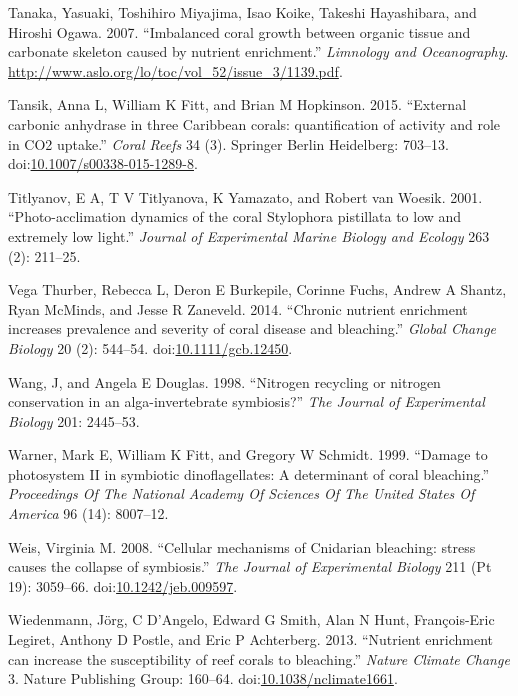 \documentclass[]{elsarticle} %
\begin{document}
\hypertarget{ref-Tanaka:2007uv}{}
Tanaka, Yasuaki, Toshihiro Miyajima, Isao Koike, Takeshi Hayashibara,
and Hiroshi Ogawa. 2007. ``Imbalanced coral growth between organic
tissue and carbonate skeleton caused by nutrient enrichment.''
\emph{Limnology and Oceanography}.
\url{http://www.aslo.org/lo/toc/vol_52/issue_3/1139.pdf}.

\hypertarget{ref-Tansik:2015cm}{}
Tansik, Anna L, William K Fitt, and Brian M Hopkinson. 2015. ``External
carbonic anhydrase in three Caribbean corals: quantification of activity
and role in CO2 uptake.'' \emph{Coral Reefs} 34 (3). Springer Berlin
Heidelberg: 703--13.
doi:\href{https://doi.org/10.1007/s00338-015-1289-8}{10.1007/s00338-015-1289-8}.

\hypertarget{ref-Titlyanov:2001p3631}{}
Titlyanov, E A, T V Titlyanova, K Yamazato, and Robert van Woesik. 2001.
``Photo-acclimation dynamics of the coral Stylophora pistillata to low
and extremely low light.'' \emph{Journal of Experimental Marine Biology
and Ecology} 263 (2): 211--25.

\hypertarget{ref-VegaThurber:2014hk}{}
Vega Thurber, Rebecca L, Deron E Burkepile, Corinne Fuchs, Andrew A
Shantz, Ryan McMinds, and Jesse R Zaneveld. 2014. ``Chronic nutrient
enrichment increases prevalence and severity of coral disease and
bleaching.'' \emph{Global Change Biology} 20 (2): 544--54.
doi:\href{https://doi.org/10.1111/gcb.12450}{10.1111/gcb.12450}.

\hypertarget{ref-Wang:1998p128}{}
Wang, J, and Angela E Douglas. 1998. ``Nitrogen recycling or nitrogen
conservation in an alga-invertebrate symbiosis?'' \emph{The Journal of
Experimental Biology} 201: 2445--53.

\hypertarget{ref-Warner:1999p4239}{}
Warner, Mark E, William K Fitt, and Gregory W Schmidt. 1999. ``Damage to
photosystem II in symbiotic dinoflagellates: A determinant of coral
bleaching.'' \emph{Proceedings Of The National Academy Of Sciences Of
The United States Of America} 96 (14): 8007--12.

\hypertarget{ref-Weis:2008p944}{}
Weis, Virginia M. 2008. ``Cellular mechanisms of Cnidarian bleaching:
stress causes the collapse of symbiosis.'' \emph{The Journal of
Experimental Biology} 211 (Pt 19): 3059--66.
doi:\href{https://doi.org/10.1242/jeb.009597}{10.1242/jeb.009597}.

\hypertarget{ref-Wiedenmann:2013bn}{}
Wiedenmann, Jörg, C D'Angelo, Edward G Smith, Alan N Hunt, François-Eric
Legiret, Anthony D Postle, and Eric P Achterberg. 2013. ``Nutrient
enrichment can increase the susceptibility of reef corals to
bleaching.'' \emph{Nature Climate Change} 3. Nature Publishing Group:
160--64.
doi:\href{https://doi.org/10.1038/nclimate1661}{10.1038/nclimate1661}.
\end{document}

